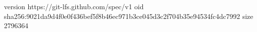 version https://git-lfs.github.com/spec/v1
oid sha256:9021da9d4f0e0f436bef5f8b46ec971b3ce045d3c2f704b35e94534fc4dc7992
size 2796364
